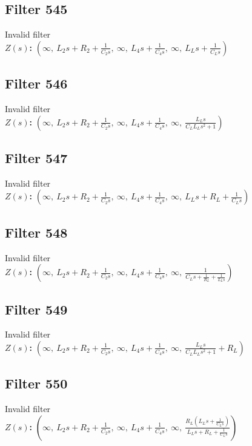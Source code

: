 \documentclass{article}
\begin{document}
\subsection*{Filter 545}
Invalid filter \\ 
\textbf{$Z(s)$:} $\left( \infty, \  L_{2} s + R_{2} + \frac{1}{C_{2} s}, \  \infty, \  L_{4} s + \frac{1}{C_{4} s}, \  \infty, \  L_{L} s + \frac{1}{C_{L} s}\right)$ \\ 
\subsection*{Filter 546}
Invalid filter \\ 
\textbf{$Z(s)$:} $\left( \infty, \  L_{2} s + R_{2} + \frac{1}{C_{2} s}, \  \infty, \  L_{4} s + \frac{1}{C_{4} s}, \  \infty, \  \frac{L_{L} s}{C_{L} L_{L} s^{2} + 1}\right)$ \\ 
\subsection*{Filter 547}
Invalid filter \\ 
\textbf{$Z(s)$:} $\left( \infty, \  L_{2} s + R_{2} + \frac{1}{C_{2} s}, \  \infty, \  L_{4} s + \frac{1}{C_{4} s}, \  \infty, \  L_{L} s + R_{L} + \frac{1}{C_{L} s}\right)$ \\ 
\subsection*{Filter 548}
Invalid filter \\ 
\textbf{$Z(s)$:} $\left( \infty, \  L_{2} s + R_{2} + \frac{1}{C_{2} s}, \  \infty, \  L_{4} s + \frac{1}{C_{4} s}, \  \infty, \  \frac{1}{C_{L} s + \frac{1}{R_{L}} + \frac{1}{L_{L} s}}\right)$ \\ 
\subsection*{Filter 549}
Invalid filter \\ 
\textbf{$Z(s)$:} $\left( \infty, \  L_{2} s + R_{2} + \frac{1}{C_{2} s}, \  \infty, \  L_{4} s + \frac{1}{C_{4} s}, \  \infty, \  \frac{L_{L} s}{C_{L} L_{L} s^{2} + 1} + R_{L}\right)$ \\ 
\subsection*{Filter 550}
Invalid filter \\ 
\textbf{$Z(s)$:} $\left( \infty, \  L_{2} s + R_{2} + \frac{1}{C_{2} s}, \  \infty, \  L_{4} s + \frac{1}{C_{4} s}, \  \infty, \  \frac{R_{L} \left(L_{L} s + \frac{1}{C_{L} s}\right)}{L_{L} s + R_{L} + \frac{1}{C_{L} s}}\right)$ \\ 
\end{document}
